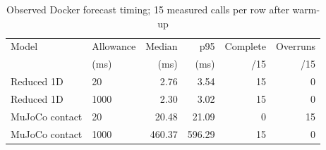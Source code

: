 \begin{table}[t]
\caption{Observed Docker forecast timing; 15 measured calls per row after warm-up}
\label{tab:timing}
\centering\small
\begin{tabular}{llrrrr}
\toprule
Model & Allowance & Median & p95 & Complete & Overruns\\
 & (ms) & (ms) & (ms) & /15 & /15\\
\midrule
Reduced 1D & 20 & 2.76 & 3.54 & 15 & 0\\
Reduced 1D & 1000 & 2.30 & 3.02 & 15 & 0\\
MuJoCo contact & 20 & 20.48 & 21.09 & 0 & 15\\
MuJoCo contact & 1000 & 460.37 & 596.29 & 15 & 0\\
\bottomrule
\end{tabular}
\end{table}
